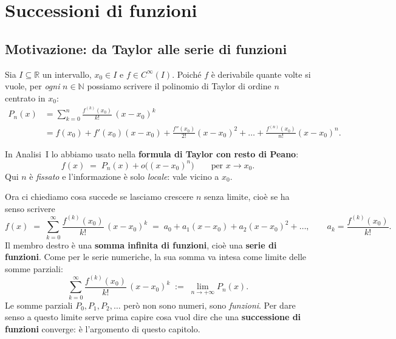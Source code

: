 
\section{Successioni di funzioni}

\subsection{Motivazione: da Taylor alle serie di funzioni}

Sia $I \subseteq \mathbb{R}$ un intervallo, $x_0 \in I$ e $f \in C^\infty(I)$.
Poiché $f$ è derivabile quante volte si vuole, per \emph{ogni} $n \in \mathbb{N}$
possiamo scrivere il polinomio di Taylor di ordine $n$ centrato in $x_0$:
\[
\begin{aligned}
  P_n(x) &= \sum_{k=0}^{n} \frac{f^{(k)}(x_0)}{k!}\,(x-x_0)^k \\
         &= f(x_0) + f'(x_0)(x-x_0) + \frac{f''(x_0)}{2!}(x-x_0)^2 + \dots
            + \frac{f^{(n)}(x_0)}{n!}(x-x_0)^n .
\end{aligned}
\]

In Analisi~I lo abbiamo usato nella \textbf{formula di Taylor con resto di Peano}:
\[
  f(x) \;=\; P_n(x) + o\big((x-x_0)^n\big) \qquad \text{per } x \to x_0 .
\]
Qui $n$ è \emph{fissato} e l'informazione è solo \emph{locale}: vale vicino a $x_0$.

Ora ci chiediamo cosa succede se lasciamo crescere $n$ senza limite, cioè se ha
senso scrivere
\[
  f(x) \;=\; \sum_{k=0}^{\infty} \frac{f^{(k)}(x_0)}{k!}\,(x-x_0)^k
  \;=\; a_0 + a_1 (x-x_0) + a_2 (x-x_0)^2 + \dots ,
  \qquad a_k = \frac{f^{(k)}(x_0)}{k!} .
\]
Il membro destro è una \textbf{somma infinita di funzioni}, cioè una
\textbf{serie di funzioni}. Come per le serie numeriche, la sua somma va intesa
come limite delle somme parziali:
\[
  \sum_{k=0}^{\infty} \frac{f^{(k)}(x_0)}{k!}\,(x-x_0)^k
  \;:=\; \lim_{n \to +\infty} P_n(x) .
\]
Le somme parziali $P_0, P_1, P_2, \dots$ però non sono numeri, sono
\emph{funzioni}. Per dare senso a questo limite serve prima capire cosa vuol dire
che una \textbf{successione di funzioni} converge: è l'argomento di questo capitolo.


